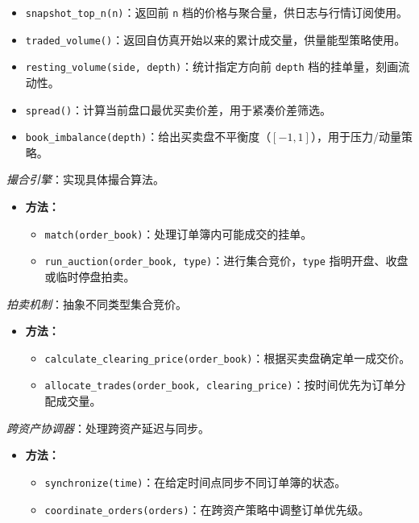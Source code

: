 \begin{description}
\begin{itemize}
\begin{itemize}
        \item \verb|snapshot_top_n(n)|：返回前 \verb|n| 档的价格与聚合量，供日志与行情订阅使用。
        \item \verb|traded_volume()|：返回自仿真开始以来的累计成交量，供量能型策略使用。
        \item \verb|resting_volume(side, depth)|：统计指定方向前 \verb|depth| 档的挂单量，刻画流动性。
        \item \verb|spread()|：计算当前盘口最优买卖价差，用于紧凑价差筛选。
        \item \verb|book_imbalance(depth)|：给出买卖盘不平衡度（$[-1,1]$），用于压力/动量策略。
      \end{itemize}
  \end{itemize}
  \item[MatchingEngine] \emph{撮合引擎}：实现具体撮合算法。
  \begin{itemize}
    \item \textbf{方法：}
      \begin{itemize}
        \item \verb|match(order_book)|：处理订单簿内可能成交的挂单。
        \item \verb|run_auction(order_book, type)|：进行集合竞价，\verb|type| 指明开盘、收盘或临时停盘拍卖。
      \end{itemize}
  \end{itemize}
  \item[AuctionMechanism] \emph{拍卖机制}：抽象不同类型集合竞价。
  \begin{itemize}
    \item \textbf{方法：}
      \begin{itemize}
        \item \verb|calculate_clearing_price(order_book)|：根据买卖盘确定单一成交价。
        \item \verb|allocate_trades(order_book, clearing_price)|：按时间优先为订单分配成交量。
      \end{itemize}
  \end{itemize}
  \item[CrossAssetCoordinator] \emph{跨资产协调器}：处理跨资产延迟与同步。
  \begin{itemize}
    \item \textbf{方法：}
      \begin{itemize}
        \item \verb|synchronize(time)|：在给定时间点同步不同订单簿的状态。
        \item \verb|coordinate_orders(orders)|：在跨资产策略中调整订单优先级。
      \end{itemize}
  \end{itemize}
\end{description}

